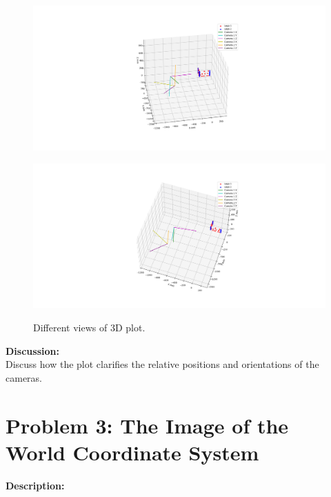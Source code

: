 \documentclass{article}
\begin{document}
\begin{figure}[h]
  \centering
  \begin{minipage}{0.45\textwidth}
      \centering
      \includegraphics[width=\textwidth,  trim=350 0 350 0, clip]{Figure_3.png}
      \label{fig:image1}
  \end{minipage}\hfill
  \begin{minipage}{0.45\textwidth}
      \centering
      \includegraphics[width=\textwidth,  trim=350 0 350 0, clip]{Figure_4.png}
      \label{fig:image2}
  \end{minipage}
  \caption{Different views of 3D plot.}
  \label{fig:side_by_side}
\end{figure}

\textbf{Discussion:} \\
Discuss how the plot clarifies the relative positions and orientations of the cameras.

\newpage
\section{Problem 3: The Image of the World Coordinate System}
\textbf{Description:} \\
\end{document}

